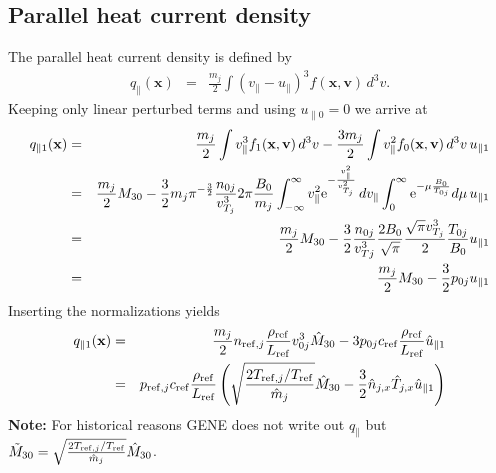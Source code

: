 \subsection{Parallel heat current density}
The parallel heat current density is defined by
\begin{eqnarray*}
q_{\|}(\mathbf{x}) &=& \frac{m_j}{2} \int \left(v_{\|}-u_{\|}\right)^3 
  f(\mathbf{x},\mathbf{v})\,d^3v.
\end{eqnarray*}
Keeping only linear perturbed terms and using $u_{\| 0}=0$ we arrive at
\begin{eqnarray*}
q_{\| 1}(\mathbf{x}) &=& \frac{m_j}{2} \int v_{\|}^3 f_1(\mathbf{x},\mathbf{v})\,d^3v
 - \frac{3m_j}{2} \int v_{\|}^2 f_0(\mathbf{x},\mathbf{v})\,d^3v\,u_{\| 1}\\
&=& \frac{m_j}{2} M_{30} - \frac{3}{2} m_j \pi^{-\frac{3}{2}}\frac{n_{0j}}{v_{T_j}^3}2\pi\frac{B_0}{m_j}
 \int_{-\infty}^{\infty} v_{\|}^2{\rm e}^{-\frac{v_\|^2}{v_{T_j}^2}}\,dv_\| 
 \int_{0}^{\infty} {\rm e}^{-\mu\frac{B_0}{T_{0j}}}d\mu\, u_{\| 1} \\
&=& \frac{m_j}{2} M_{30} - \frac{3}{2} \frac{n_{0j}}{v_{Tj}^3}\frac{2B_0}{\sqrt{\pi}} 
 \frac{\sqrt{\pi}v_{T_j}^3}{2} \frac{T_{0j}}{B_0}u_{\| 1}\\
&=& \frac{m_j}{2} M_{30} - \frac{3}{2} p_{0j} u_{\| 1}
\end{eqnarray*}
Inserting the normalizations yields
\begin{eqnarray*}
q_{\| 1}(\mathbf{x}) &=& \frac{m_j}{2} n_{\mathrm{ref},j} \frac{\rho_{\mathrm{ref}}}{L_{\mathrm{ref}}} v_{0j}^3 \hat{M}_{30} 
  - 3 p_{0j} c_{\mathrm{ref}} \frac{\rho_{\mathrm{ref}}}{L_{\mathrm{ref}}}\hat{u}_{\| 1}\\
&=& p_{\mathrm{ref},j} c_{\mathrm{ref}} \frac{\rho_{\mathrm{ref}}}{L_{\mathrm{ref}}} \left(\sqrt{\frac{2T_{\mathrm{ref},j}/T_{\mathrm{ref}}}{\hat{m}_j}}\hat{M}_{30} 
  - \frac{3}{2}\hat{n}_{j,x}\hat{T}_{j,x}\hat{u}_{\| 1}\right)
\end{eqnarray*}
{\bf Note:} For historical reasons {\sc GENE} does not write out $q_\|$ but 
$\tilde{M}_{30}=\sqrt{\frac{2T_{\mathrm{ref},j}/T_{\mathrm{ref}}}{\hat{m}_j}}\hat{M}_{30}$.

